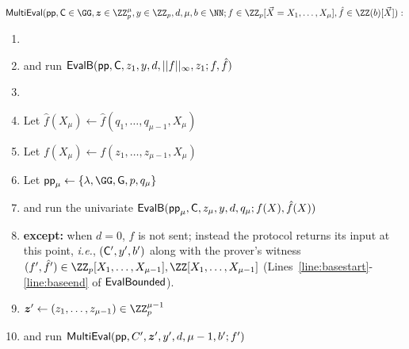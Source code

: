  \begin{mdframed}
\begin{minipage}{\textwidth}
			$\pro{MultiEval}(\params, \gr{C}\in \GG, \boldsymbol{z}\in \ZZ^\mu_p,y \in \ZZ_p, d,\mu,b \in \NN; f \in \ZZ_p[\vec{X}= X_1,\ldots,X_\mu], \hat{f}\in \ZZ(b)[\vec{X}]) :$
			\begin{enumerate}[nolistsep]
			\item {} 
			\item \pcind[1] \prover and \verifier run $\pro{EvalB}(\params,\gr{C},z_1,y,d,||f||_\infty,z_1;f,\hat{f})$ 
			\item \pcelse
			\item \pcind[1] Let $\hat{f}(X_\mu)\gets \hat{f}(q_1,\dots,q_{\mu-1},X_\mu)$
			\item \pcind[1] Let $f(X_\mu)\gets f(z_1,\dots,z_{\mu-1},X_\mu)$

			\item \pcind[1] Let $\crs_\mu \gets \{\lambda,\GG,\gr{g},p,q_\mu\}$
			\item \pcind[1] \prover and \verifier run the univariate $\pro{EvalB}(\params_\mu,\gr{C},z_\mu,y,d,q_\mu;f(X),\hat{f}(X))$
			\item \pcind[2] \textbf{except:} when $d=0$, $f$ is not sent; instead the protocol returns its input at this point, \emph{i.e.}, $(\gr{C}',y',b')$ along with the prover's witness $(f',\hat{f}') \in \ZZ_p[X_1,\dots,X_{\mu-1}],\ZZ[X_1,\dots,X_{\mu-1}]$ (Lines~\ref{line:basestart}-\ref{line:baseend} of $\textsf{{EvalBounded}}$). 
			\item \pcind[1]$\boldsymbol{z}'\gets (z_1,\dots,z_{\mu-1})\in \ZZ_p^{\mu-1}$
			\item \pcind[1]\prover and \verifier run $\textsf{{MultiEval}}(\textsf{pp},C',\boldsymbol{z}',y',d,\mu-1,b';f')$
		    \end{enumerate}
      \end{minipage}
\end{mdframed}

